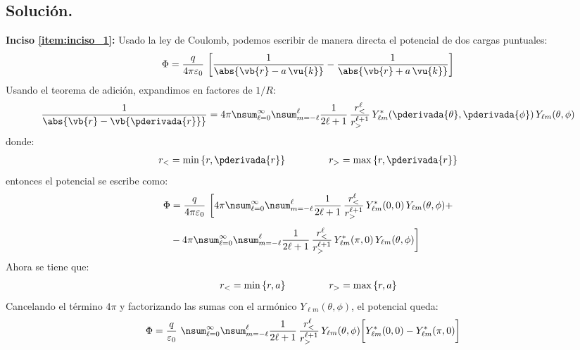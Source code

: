 \subsection{Solución.}

\noindent
\textbf{Inciso \ref{item:inciso_1}:} Usado la ley de Coulomb, podemos escribir de manera directa el potencial de dos cargas puntuales:
\begin{align*}
\Phi = \dfrac{q}{4 \pi \varepsilon_{0}} ~ \bigg[ \dfrac{1}{\abs{\vb{r} - a \, \vu{k}}} - \dfrac{1}{\abs{\vb{r} + a \, \vu{k}}} \bigg]
\end{align*}
Usando el teorema de adición, expandimos en factores de $1/R$:
\begin{align*}
\dfrac{1}{\abs{\vb{r} - \vb{\pderivada{r}}}} = 4 \pi \nsum_{\ell=0}^{\infty} \nsum_{m=-\ell}^{\ell} \dfrac{1}{2 \ell + 1} \, \dfrac{r_{<}^{\ell}}{r_{>}^{\ell+1}} \, Y_{\ell m}^{*} (\pderivada{\theta}, \pderivada{\phi}) \, Y_{\ell m} (\theta, \phi)
\end{align*}
donde:
\begin{align*}
r_{<} = \min \left\{ r, \pderivada{r} \right\} \hspace{1.5cm} r_{>} = \max \left\{ r, \pderivada{r} \right\}
\end{align*}
entonces el potencial se escribe como:
\begin{align*}
\Phi &= \dfrac{q}{4 \pi \varepsilon_{0}} ~ \bigg[ 4 \pi \nsum_{\ell=0}^{\infty} \nsum_{m=-\ell}^{\ell} \dfrac{1}{2 \ell + 1} \, \dfrac{r_{<}^{\ell}}{r_{>}^{\ell+1}} \, Y_{\ell m}^{*} (0, 0) \, Y_{\ell m} (\theta, \phi) + \\[0.5em]
&- 4 \pi \nsum_{\ell=0}^{\infty} \nsum_{m=-\ell}^{\ell} \dfrac{1}{2 \ell + 1} \, \dfrac{r_{<}^{\ell}}{r_{>}^{\ell+1}} \, Y_{\ell m}^{*} (\pi, 0) \, Y_{\ell m} (\theta, \phi) \bigg]
\end{align*}
Ahora se tiene que:
\begin{align*}
r_{<} = \min \left\{ r, a \right\} \hspace{1.5cm} r_{>} = \max \left\{ r, a \right\}
\end{align*}
Cancelando el término $4 \pi$ y factorizando las sumas con el armónico $Y_{\ell m} (\theta, \phi)$, el potencial queda:
\begin{align*}
\Phi &= \dfrac{q}{\varepsilon_{0}} ~ \nsum_{\ell=0}^{\infty} \nsum_{m=-\ell}^{\ell} \dfrac{1}{2 \ell + 1} \, \dfrac{r_{<}^{\ell}}{r_{>}^{\ell+1}} \, Y_{\ell m} (\theta, \phi) \bigg[ Y_{\ell m}^{*} (0, 0) - Y_{\ell m}^{*} (\pi, 0) \bigg]    
\end{align*} 
